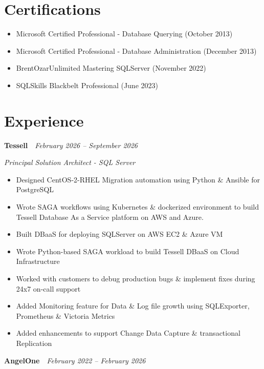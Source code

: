 \documentclass[10pt,a4paper]{article}
\begin{document}
\section{Certifications}
\begin{itemize}
  \item Microsoft Certified Professional - Database Querying (October 2013)
  \item Microsoft Certified Professional - Database Administration (December 2013)
  \item BrentOzarUnlimited Mastering SQLServer (November 2022)
  \item SQLSkills Blackbelt Professional (June 2023)
\end{itemize}

\section{Experience}

\noindent\textbf{Tessell}~\hfill~\textit{February 2026 -- September 2026}

\textit{Principal Solution Architect - SQL Server}
\begin{itemize}
  \item Designed CentOS-2-RHEL Migration automation using Python \& Ansible for PostgreSQL
  \item Wrote SAGA workflows using Kubernetes \& dockerized environment to build Tessell Database As a Service platform on AWS and Azure.
  \item Built DBaaS for deploying SQLServer on AWS EC2 \& Azure VM
  \item Wrote Python-based SAGA workload to build Tessell DBaaS on Cloud Infrastructure
  \item Worked with customers to debug production bugs \& implement fixes during 24x7 on-call support
  \item Added Monitoring feature for Data \& Log file growth using SQLExporter, Prometheus \& Victoria Metrics
  \item Added enhancements to support Change Data Capture \& transactional Replication
\end{itemize}

\noindent\textbf{AngelOne}~\hfill~\textit{February 2022 -- February 2026}
\end{document}
